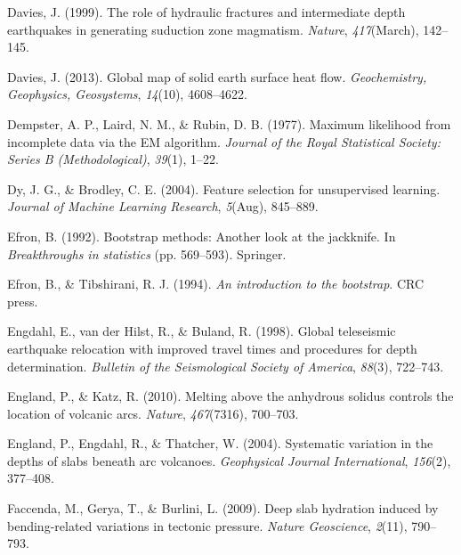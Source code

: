 \begin{CSLReferences}{1}{1}
\leavevmode{}%
Davies, J. (1999). The role of hydraulic fractures and intermediate depth earthquakes in generating suduction zone magmatism. \emph{Nature}, \emph{417}(March), 142--145.

\leavevmode{}%
Davies, J. (2013). Global map of solid earth surface heat flow. \emph{Geochemistry, Geophysics, Geosystems}, \emph{14}(10), 4608--4622.

\leavevmode{}%
Dempster, A. P., Laird, N. M., \& Rubin, D. B. (1977). Maximum likelihood from incomplete data via the EM algorithm. \emph{Journal of the Royal Statistical Society: Series B (Methodological)}, \emph{39}(1), 1--22.

\leavevmode{}%
Dy, J. G., \& Brodley, C. E. (2004). Feature selection for unsupervised learning. \emph{Journal of Machine Learning Research}, \emph{5}(Aug), 845--889.

\leavevmode{}%
Efron, B. (1992). Bootstrap methods: Another look at the jackknife. In \emph{Breakthroughs in statistics} (pp. 569--593). Springer.

\leavevmode{}%
Efron, B., \& Tibshirani, R. J. (1994). \emph{An introduction to the bootstrap}. CRC press.

\leavevmode{}%
Engdahl, E., van der Hilst, R., \& Buland, R. (1998). Global teleseismic earthquake relocation with improved travel times and procedures for depth determination. \emph{Bulletin of the Seismological Society of America}, \emph{88}(3), 722--743.

\leavevmode{}%
England, P., \& Katz, R. (2010). Melting above the anhydrous solidus controls the location of volcanic arcs. \emph{Nature}, \emph{467}(7316), 700--703.

\leavevmode{}%
England, P., Engdahl, R., \& Thatcher, W. (2004). Systematic variation in the depths of slabs beneath arc volcanoes. \emph{Geophysical Journal International}, \emph{156}(2), 377--408.

\leavevmode{}%
Faccenda, M., Gerya, T., \& Burlini, L. (2009). Deep slab hydration induced by bending-related variations in tectonic pressure. \emph{Nature Geoscience}, \emph{2}(11), 790--793.


\end{CSLReferences}
